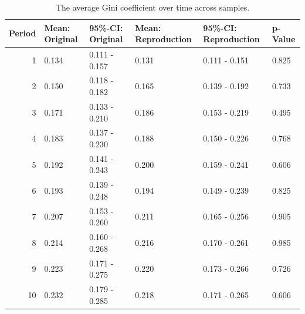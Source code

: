 \documentclass[
  authoryear,
  review,
  3p,
  onecolumn]{elsarticle}
\begin{document}
\hypertarget{tbl-gini-periods}{}
\begin{table}
\caption{\label{tbl-gini-periods}The average Gini coefficient over time across samples. }\tabularnewline

\centering
\begin{tabular}{r|l|l|l|l|l}
\hline
Period & Mean: Original & 95\%-CI: Original & Mean: Reproduction & 95\%-CI: Reproduction & p-Value\\
\hline
1 & 0.134 & 0.111 - 0.157 & 0.131 & 0.111 - 0.151 & 0.825\\
\hline
2 & 0.150 & 0.118 - 0.182 & 0.165 & 0.139 - 0.192 & 0.733\\
\hline
3 & 0.171 & 0.133 - 0.210 & 0.186 & 0.153 - 0.219 & 0.495\\
\hline
4 & 0.183 & 0.137 - 0.230 & 0.188 & 0.150 - 0.226 & 0.768\\
\hline
5 & 0.192 & 0.141 - 0.243 & 0.200 & 0.159 - 0.241 & 0.606\\
\hline
6 & 0.193 & 0.139 - 0.248 & 0.194 & 0.149 - 0.239 & 0.825\\
\hline
7 & 0.207 & 0.153 - 0.260 & 0.211 & 0.165 - 0.256 & 0.905\\
\hline
8 & 0.214 & 0.160 - 0.268 & 0.216 & 0.170 - 0.261 & 0.985\\
\hline
9 & 0.223 & 0.171 - 0.275 & 0.220 & 0.173 - 0.266 & 0.726\\
\hline
10 & 0.232 & 0.179 - 0.285 & 0.218 & 0.171 - 0.265 & 0.606\\
\hline
\end{tabular}
\end{table}

\newpage{}


  
\end{document}
